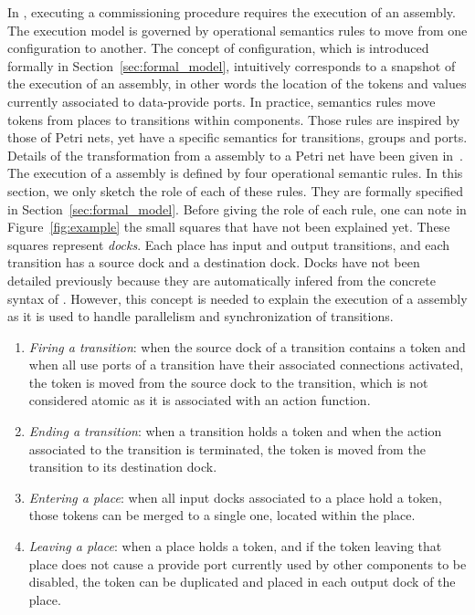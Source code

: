 In \mad, executing a commissioning procedure requires the execution of an
assembly. The \mad execution model is governed by operational
semantics rules to move from one configuration to another. The concept
of configuration, which is introduced formally in
Section~\ref{sec:formal_model}, intuitively corresponds to a snapshot
of the execution of an assembly, in other words the location of the
tokens and values currently associated to data-provide ports. In
practice, semantics rules move tokens from places to transitions within
components. Those rules are inspired by those of Petri nets, yet have
a specific semantics for transitions, groups and ports. Details of the
transformation from a \mad assembly to a Petri net have been given
in~\cite{coullon:hal-02323641}. The execution of a \mad assembly is
defined by four operational semantic rules. In this section, we only
sketch the role of each of these rules. They are formally specified in
Section~\ref{sec:formal_model}. Before giving the role of each rule,
one can note in Figure~\ref{fig:example} the small squares that have
not been explained yet. These squares represent \emph{docks}. Each
place has input and output transitions, and each transition has a
source dock and a destination dock. Docks have not been detailed
previously because they are automatically infered from the concrete
syntax of \mad. However, this concept is needed to explain the
execution of a \mad assembly as it is used to handle parallelism and
synchronization of transitions.
%
\begin{enumerate}
\item \emph{Firing a transition}: when the source dock of a transition
  contains a token and when all use ports of a transition have their
  associated connections activated, the token is moved from the source
  dock to the transition, which is not considered atomic as it is
  associated with an action function.
\item \emph{Ending a transition}: when a transition holds a token and
  when the action associated to the transition is terminated, the
  token is moved from the transition to its destination dock.
\item \emph{Entering a place}: when all input docks associated to a
  place hold a token, those tokens can be merged to a single one, located
  within the place.
\item \emph{Leaving a place}: when a place holds a token, and if the
  token leaving that place does not cause a provide port currently
  used by other components to be disabled,
  the token can be duplicated and placed in each output dock of the
  place.
\end{enumerate}

